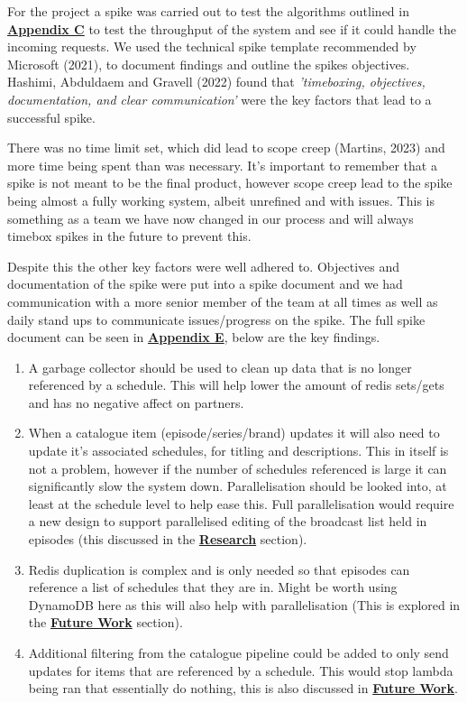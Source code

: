   For the project a spike was carried out to test the algorithms outlined in \hyperref[sec:AppendixC]{\textbf{Appendix C}} to test the 
  throughput of the system and see if it could handle the incoming requests. We used the technical spike template recommended by Microsoft (2021), to 
  document findings and outline the spikes objectives. Hashimi, Abduldaem and Gravell (2022) found that  \textit{'timeboxing, objectives,
  documentation, and clear communication'} were the key factors that lead to a successful spike.

  There was no time limit set, which did lead to scope creep (Martins, 2023) and more time being spent than was necessary. It's important to remember that a 
  spike is not meant to be the final product, however scope creep lead to the spike being almost a fully working system, albeit unrefined and with issues. 
  This is something as a team we have now changed in our process and will always timebox spikes in the future to prevent this.

  Despite this the other key factors were well adhered to. Objectives and documentation of the spike were put into a spike document
  and we had communication with a more senior member of the team at all times as well as daily stand ups to communicate issues/progress on the spike. 
  The full spike document can be seen in \hyperref[sec:AppendixE]{\textbf{Appendix E}}, below are the key findings.

  \begin{enumerate}
    \item A garbage collector should be used to clean up data that is no longer referenced by a schedule. This will help lower the amount of redis sets/gets
    and has no negative affect on partners.
    \item When a catalogue item (episode/series/brand) updates it will also need to update it's associated schedules, for titling and descriptions. This in 
    itself is not a problem, however if the number of schedules referenced is large it can significantly slow the system down. Parallelisation should be 
    looked into, at least at the schedule level to help ease this. Full parallelisation would require a new design to support parallelised editing of the 
    broadcast list held in episodes (this discussed in the \hyperref[sec:storageSolutions]{\textbf{Research}} section).
    \item Redis duplication is complex and is only needed so that episodes can reference a list of schedules that they are in. Might be worth using 
    DynamoDB here as this will also help with parallelisation (This is explored in the \hyperref[sec:future]{\textbf{Future Work}} section).
    \item Additional filtering from the catalogue pipeline could be added to only send updates for items that are referenced by a schedule. This would 
    stop lambda being ran that essentially do nothing, this is also discussed in \hyperref[sec:future]{\textbf{Future Work}}.
  \end{enumerate}

